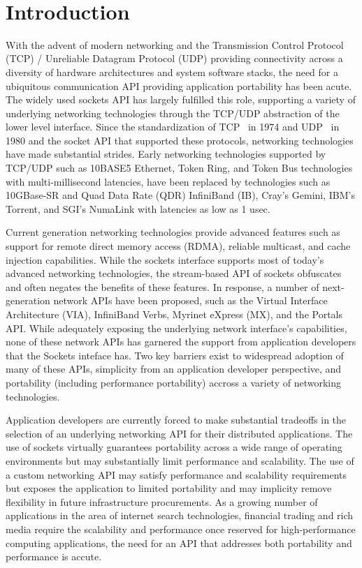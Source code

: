  \section{Introduction}


With the advent of modern networking and the Transmission Control
Protocol (TCP) / Unreliable Datagram Protocol (UDP) providing
connectivity across a diversity of hardware architectures and system
software stacks, the need for a ubiquitous communication API providing
application portability has been acute. The widely used sockets API
has largely fulfilled this role, supporting a variety of underlying
networking technologies through the TCP/UDP abstraction of the lower
level interface. Since the standardization of TCP~\cite{tcp-rfc-675}
in 1974 and UDP~\cite{udp-rfc-768} in 1980 and the socket API that
supported these protocols, networking technologies have made
substantial strides. Early networking technologies supported by
TCP/UDP such as 10BASE5 Ethernet, Token Ring, and Token Bus
technologies with multi-millisecond latencies, have been replaced by
technologies such as 10GBase-SR and Quad Data Rate (QDR) InfiniBand
(IB), Cray's Gemini, IBM's Torrent, and SGI's NumaLink  with latencies
as low as 1 usec. 

Current generation networking technologies provide advanced features
such as support for remote direct memory access (RDMA), reliable
multicast, and cache injection capabilities. While the sockets
interface supports most of today's advanced networking technologies,
the stream-based API of sockets obfuscates and often negates the
benefits of these features. In response, a number of next-generation
network APIs have been proposed, such as the Virtual Interface
Architecture (VIA), InfiniBand Verbs, Myrinet eXpress (MX), and the
Portals API. While adequately exposing the underlying network
interface's capabilities, none of these network APIs has garnered the
support from application developers that the Sockets inteface
has. Two key barriers exist to widespread adoption of many of these
APIs, simplicity from an application developer perspective, and
portability (including performance portability) accross a variety of
networking technologies. 

Application developers are currently forced to make substantial
tradeoffs in the selection of an underlying networking API for their
distributed applications. The use of sockets virtually guarantees
portability across a wide range of operating environments but may
substantially limit performance and scalability. The use of a custom
networking API may satisfy performance and scalability requirements
but exposes the application to limited portability and may implicity
remove flexibility in future infrastructure procurements. As a growing
number of applications in the area of internet search technologies,
financial trading and rich media require the scalability and
performance once reserved for high-performance computing applications,
the need for an API that addresses both portability and performance is
accute. 

